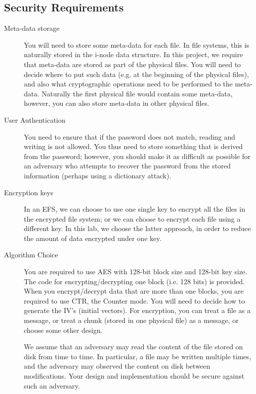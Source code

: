 \documentclass[11pt]{article}
\begin{document}
\subsection{Security Requirements}


\begin{description}
 \item[Meta-data storage]
You will need to store some meta-data for each file.  In file systems, this is naturally stored in the i-node data structure.  In this project, we require that meta-data are stored as part of the physical files.  You will need to decide where to put such data (e.g. at the beginning of the physical files), and also what cryptographic operations need to be performed to the meta-data.  Naturally the first physical file would contain some meta-data, however, you can also store meta-data in other physical files.

 \item[User Authentication]
You need to ensure that if the password does not match, reading and writing is not allowed.  You thus need to store something that is derived from the password; however, you should make it as difficult as possible for an adversary who attempts to recover the password  from the stored information (perhaps using a dictionary attack).

 \item[Encryption keys]
In an EFS, we can choose to use one single key to encrypt all the files in the encrypted file system; or we can choose to encrypt each file using
a different key. In this lab, we choose the latter approach, in order to reduce the amount of data encrypted under one key. %



 \item[Algorithm Choice]
You are required to use AES with 128-bit block size and 128-bit key size.  The code for encrypting/decrypting one block (i.e. 128 bits) is provided.  When you encrypt/decrypt data that are more than one blocks, you are required to use CTR, the Counter mode.  You will need to decide how to generate the IV's (initial vectors).  For encryption, you can treat a file as a message, or treat a chunk (stored in one physical file) as a message, or choose some other design.

We assume that an adversary may read the content of the file stored on disk from time to time.  In particular, a file may be written multiple times, and the adversary may observed the content on disk between modifications.  Your design and implementation should be secure against such an adversary.


\end{description}
\end{document}

